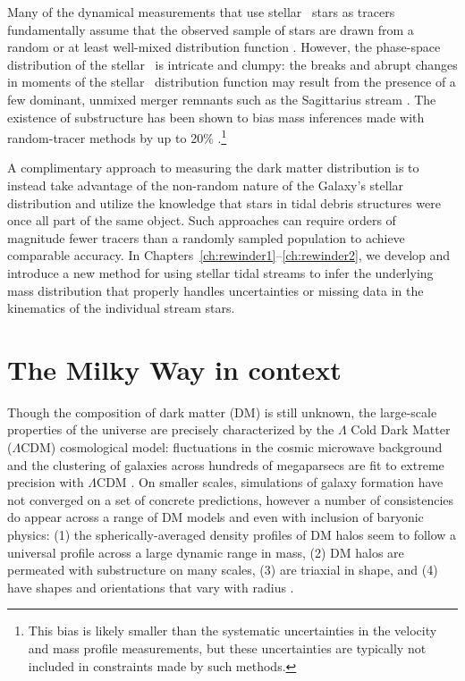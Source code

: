 Many of the dynamical measurements that use stellar \mwhalo\ stars as tracers
fundamentally assume that the observed sample of stars are drawn from a random
or at least well-mixed distribution function \citep[e.g.,][]{battaglia05,
kafle12, kafle14}. However, the phase-space distribution of the stellar \mwhalo\
is intricate and clumpy: the breaks and abrupt changes in moments of the stellar
\mwhalo\ distribution function may result from the presence of a few dominant,
unmixed merger remnants such as the Sagittarius stream \citep[which contains
almost as much stellar mass as the rest of the stellar \mwhalo\
combined;][]{niedersteostholt10}. The existence of substructure has been shown
to bias mass inferences made with random-tracer methods by up to 20\%
\citep{yencho06}.\footnote{This bias is likely smaller than the systematic
uncertainties in the velocity and mass profile measurements, but these
uncertainties are typically not included in constraints made by such methods.}

A complimentary approach to measuring the dark matter distribution is to instead
take advantage of the non-random nature of the Galaxy's stellar distribution and
utilize the knowledge that stars in tidal debris structures were once all part
of the same object. Such approaches can require orders of magnitude fewer
tracers than a randomly sampled population to achieve comparable accuracy. In
\todo{why is this broken} Chapters~\ref{ch:rewinder1}--\ref{ch:rewinder2}, we
develop and introduce a new method for using stellar tidal streams to infer the
underlying mass distribution that properly handles uncertainties or missing data
in the kinematics of the individual stream stars.

\section{The Milky Way in context} \label{sec:mw-context}

Though the composition of dark matter (DM) is still unknown, the large-scale
properties of the universe are precisely characterized by the $\Lambda$ Cold
Dark Matter ($\Lambda$CDM) cosmological model: fluctuations in the cosmic
microwave background and the clustering of galaxies across hundreds of
megaparsecs are fit to extreme precision with $\Lambda$CDM \citep{planck15,
sanchez12}. On smaller scales, simulations of galaxy formation have not
converged on a set of concrete predictions, however a number of consistencies do
appear across a range of DM models and even with inclusion of baryonic physics:
(1) the spherically-averaged density profiles of DM halos seem to follow a
universal profile across a large dynamic range in mass, (2) DM halos are
permeated with substructure on many scales, (3) are triaxial in shape, and (4)
have shapes and orientations that vary with radius \citep{dubinski91, navarro96,
jing02, kuhlen07, veraciro11}.

